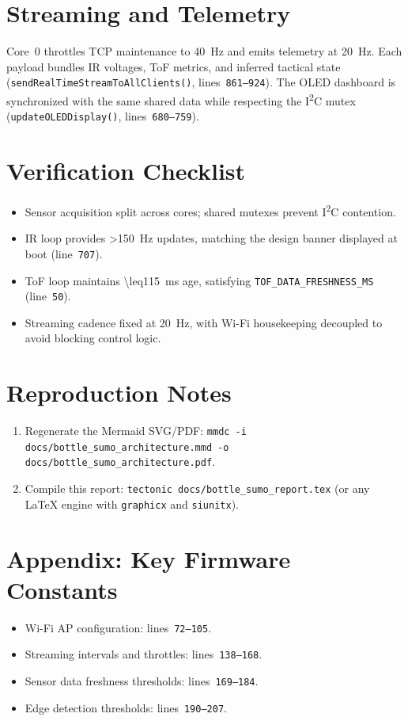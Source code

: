 \documentclass[11pt]{article}
\begin{document}
\section{Streaming and Telemetry}\label{sec:streaming}
Core~0 throttles TCP maintenance to \SI{40}{Hz} and emits telemetry at \SI{20}{Hz}. Each payload bundles IR voltages, ToF metrics, and inferred tactical state (\texttt{sendRealTimeStreamToAllClients()}, lines~\texttt{861--924}). The OLED dashboard is synchronized with the same shared data while respecting the I\textsuperscript{2}C mutex (\texttt{updateOLEDDisplay()}, lines~\texttt{680--759}).

\section{Verification Checklist}
\begin{itemize}
  \item Sensor acquisition split across cores; shared mutexes prevent I\textsuperscript{2}C contention.
  \item IR loop provides \SI{>150}{Hz} updates, matching the design banner displayed at boot (line~\texttt{707}).
  \item ToF loop maintains \SI{\leq115}{ms} age, satisfying \texttt{TOF\_DATA\_FRESHNESS\_MS} (line~\texttt{50}).
  \item Streaming cadence fixed at \SI{20}{Hz}, with Wi-Fi housekeeping decoupled to avoid blocking control logic.
\end{itemize}

\section{Reproduction Notes}
\begin{enumerate}
  \item Regenerate the Mermaid SVG/PDF: \texttt{mmdc -i docs/bottle\_sumo\_architecture.mmd -o docs/bottle\_sumo\_architecture.pdf}.
  \item Compile this report: \texttt{tectonic docs/bottle\_sumo\_report.tex} (or any LaTeX engine with \texttt{graphicx} and \texttt{siunitx}).
\end{enumerate}

\section{Appendix: Key Firmware Constants}
\begin{itemize}
  \item Wi-Fi AP configuration: lines~\texttt{72--105}.
  \item Streaming intervals and throttles: lines~\texttt{138--168}.
  \item Sensor data freshness thresholds: lines~\texttt{169--184}.
  \item Edge detection thresholds: lines~\texttt{190--207}.
\end{itemize}
\end{document}
